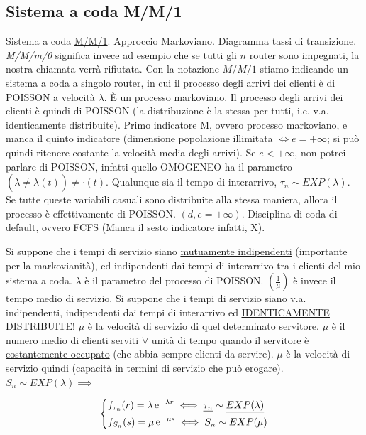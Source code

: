 \subsection{Sistema a coda M/M/1}

Sistema a coda \underline{M/M/1}. Approccio Markoviano. Diagramma tassi di transizione. \textit{M/M/m/0} significa invece ad esempio che se tutti gli $n$ router sono impegnati, la nostra chiamata verrà rifiutata. Con la notazione $M/M/1$ stiamo indicando un sistema a coda a singolo router, in cui il processo degli arrivi dei clienti è di POISSON a velocità $\lambda$. \`E un processo markoviano. Il processo degli arrivi dei clienti è quindi di POISSON (la distribuzione è la stessa per tutti, i.e. v.a. identicamente distribuite). Primo indicatore M, ovvero processo markoviano, e manca il quinto indicatore (dimensione popolazione illimitata $\iff e = +\infty$; si può quindi ritenere costante la velocità media degli arrivi). Se $e < +\infty$, non potrei parlare di POISSON, infatti quello OMOGENEO ha il parametro $(\underline{\lambda \neq	\lambda(t)}) \neq \mathord{\cdot}(t)$. Qualunque sia il tempo di interarrivo, $\tau_n \sim EXP(\lambda)$. Se tutte queste variabili casuali sono distribuite alla stessa maniera, allora il processo è effettivamente di POISSON. $(d,e = +\infty)$. Disciplina di coda di default, ovvero FCFS (Manca il sesto indicatore infatti, X).

Si suppone che i tempi di servizio siano \underline{mutuamente indipendenti} (importante per la markovianità), ed indipendenti dai tempi di interarrivo tra i clienti del mio sistema a coda. $\lambda$ è il parametro del processo di POISSON. $(\frac{1}{\mu})$ è invece il tempo medio di servizio. Si suppone che i tempi di servizio siano v.a. indipendenti, indipendenti dai tempi di interarrivo ed \underline{\underline{IDENTICAMENTE DISTRIBUITE}}! $\mu$ è la velocità di servizio di quel determinato servitore. $\mu$ è il numero medio di clienti serviti $\forall$ unità di tempo quando il servitore è \underline{costantemente occupato} (che abbia sempre clienti da servire). $\mu$ è la velocità di servizio quindi (capacità in termini di servizio che può erogare). $S_n \sim EXP(\lambda) \implies$

\[
	\left\{
	\begin{aligned}
	&f_{\tau_n}(r) = \lambda\mathop{}\!\mathrm{e}^{-\lambda r} \iff \underline{\tau_n} \sim \underline{EXP(\lambda)}\\
	&f_{S_n}(s) = \mu\mathop{}\!\mathrm{e}^{-\mu s} \iff S_n \sim EXP(\mu)
	\end{aligned}
	\right.
\]

